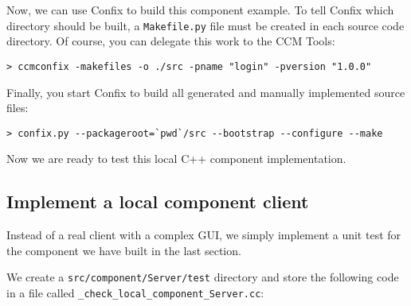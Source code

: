 Now, we can use Confix to build this component example. To tell Confix which
directory should be built, a {\tt Makefile.py} file must be created in each
source code directory.
Of course, you can delegate this work to the CCM Tools:
\begin{footnotesize}
\begin{verbatim}
> ccmconfix -makefiles -o ./src -pname "login" -pversion "1.0.0"
\end{verbatim}
\end{footnotesize} 

Finally, you start Confix to build all generated and manually implemented source
files:
\begin{footnotesize}
\begin{verbatim}
> confix.py --packageroot=`pwd`/src --bootstrap --configure --make 
\end{verbatim}
\end{footnotesize}

Now we are ready to test this local C++ component implementation.


\subsection{Implement a local component client}
\label{subsection:ImplementLocalComponentClient}

Instead of a real client with a complex GUI, we simply implement a unit test for
the component we have built in the last section.

\vspace{3mm}
We create a {\tt src/component/Server/test} directory and store the following
code in a file called {\tt \_check\_local\_component\_Server.cc}:
 
